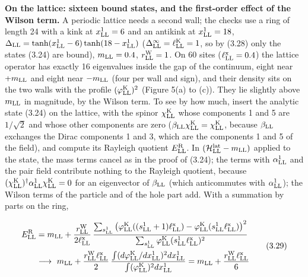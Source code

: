 \documentclass[
  10pt,
]{article}
\begin{document}
\textbf{On the lattice: sixteen bound states, and the first-order effect
of the Wilson term.} A periodic lattice needs a second wall; the checks
use a ring of length 24 with a kink at \(x^1_{\rm LL}=6\) and an
antikink at \(x^1_{\rm LL}=18\),
\(\Delta_{\rm LL}=\tanh(x^1_{\rm LL}-6)\tanh(18-x^1_{\rm LL})\)
(\(\Delta^\infty_{\rm LL}=\ell^{\rm K}_{\rm LL}=1\), so by (3.28) only
the states (3.24) are bound), \(m_{\rm LL}=0.4\),
\(r^{\rm W}_{\rm LL}=1\). On 60 sites (\(\ell^{\rm x}_{\rm LL}=0.4\))
the lattice operator has exactly 16 eigenvalues inside the gap of the
continuum, eight near \(+m_{\rm LL}\) and eight near \(-m_{\rm LL}\)
(four per wall and sign), and their density sits on the two walls with
the profile \((\varphi^{\rm K}_{\rm LL})^2\) (Figure 5(a) to (c)). They
lie slightly above \(m_{\rm LL}\) in magnitude, by the Wilson term. To
see by how much, insert the analytic state (3.24) on the lattice, with
the spinor \(\chi^{\rm K}_{\rm LL}\) whose components 1 and 5 are
\(1/\sqrt2\) and whose other components are zero
(\(\beta_{\rm LL}\chi^{\rm K}_{\rm LL}=\chi^{\rm K}_{\rm LL}\), because
\(\beta_{\rm LL}\) exchanges the Dirac components 1 and 3, which are the
components 1 and 5 of the field), and compute its Rayleigh quotient
\(E^{\rm R}_{\rm LL}\). In
\((\mathcal H^{\rm lat}_{\rm LL}-m_{\rm LL})\) applied to the state, the
mass terms cancel as in the proof of (3.24); the terms with
\(\alpha^1_{\rm LL}\) and the pair field contribute nothing to the
Rayleigh quotient, because
\((\chi^{\rm K}_{\rm LL})^\dagger\alpha^1_{\rm LL}\chi^{\rm K}_{\rm LL}=0\)
for an eigenvector of \(\beta_{\rm LL}\) (which anticommutes with
\(\alpha^1_{\rm LL}\)); the Wilson terms of the particle and of the hole
part add. With a summation by parts on the ring,

\[\begin{aligned}E^{\rm R}_{\rm LL}&=m_{\rm LL}+\frac{r^{\rm W}_{\rm LL}}{2\ell^{\rm x}_{\rm LL}}\,\frac{\sum_{s^1_{\rm LL}}\big(\varphi^{\rm K}_{\rm LL}((s^1_{\rm LL}+1)\ell^{\rm x}_{\rm LL})-\varphi^{\rm K}_{\rm LL}(s^1_{\rm LL}\ell^{\rm x}_{\rm LL})\big)^2}{\sum_{s^1_{\rm LL}}\varphi^{\rm K}_{\rm LL}(s^1_{\rm LL}\ell^{\rm x}_{\rm LL})^2}\\&\longrightarrow\ m_{\rm LL}+\frac{r^{\rm W}_{\rm LL}\ell^{\rm x}_{\rm LL}}2\,\frac{\int(d\varphi^{\rm K}_{\rm LL}/dx^1_{\rm LL})^2dx^1_{\rm LL}}{\int(\varphi^{\rm K}_{\rm LL})^2dx^1_{\rm LL}}=m_{\rm LL}+\frac{r^{\rm W}_{\rm LL}\ell^{\rm x}_{\rm LL}}6\end{aligned}\tag{3.29}\]
\end{document}

